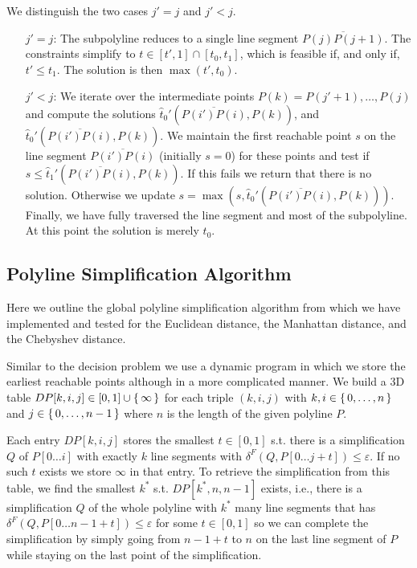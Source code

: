 We distinguish the two cases \(j' = j\) and \(j' < j\). 
\begin{enumerate}
	\item[\(j' = j\): ] The subpolyline reduces to a single line segment \(\overline{P(j)P(j+1)}\). The constraints simplify to \(t \in [t', 1] \cap [t_0, t_1]\), which is feasible if, and only if, \(t' \leq t_1\). The solution is then \(\max(t', t_0)\).

	\item[\(j' < j\): ] We iterate over the intermediate points \(P(k) = P(j'+1), \dots, P(j)\) and compute the solutions \(\hat t_0'(\overline{P(i')P(i)}, P(k))\), and \(\hat t_0'(\overline{P(i')P(i)}, P(k))\). We maintain the first reachable point \(s\) on the line segment \(\overline{P(i')P(i)}\) (initially \(s = 0\)) for these points and test if \(s \leq \hat t_1'(\overline{P(i')P(i)}, P(k))\). If this fails we return that there is no solution. Otherwise we update \(s = \max(s, \hat t_0'(\overline{P(i')P(i)}, P(k)))\). Finally, we have fully traversed the line segment and most of the subpolyline. At this point the solution is merely \(t_0\).
\end{enumerate}

\subsection{Polyline Simplification Algorithm}
\label{ssec:simple_algo_main}

Here we outline the global polyline simplification algorithm from \citeauthor{on_optimal_polyline_simplification_using_the_hausdorff_and_frechet_distance} which we have implemented and tested for the Euclidean distance, the Manhattan distance, and the Chebyshev distance. 

Similar to the decision problem we use a dynamic program in which we store the earliest reachable points although in a more complicated manner. We build a 3D table \(DP[k,i,j] \in [0, 1] \cup \set{\infty}\) for each triple \((k, i, j)\) with \(k, i \in \set{0, \dots, n}\) and \(j \in \set{0, \dots, n - 1}\) where \(n\) is the length of the given polyline \(P\). 

Each entry \(DP[k, i, j]\) stores the smallest \(t \in [0, 1]\) s.t. there is a simplification \(Q\) of \(P[0 \dots i]\) with exactly \(k\) line segments with \(\delta^F(Q, P[0\dots j + t]) \leq \varepsilon\). If no such \(t\) exists we store \(\infty\) in that entry. 
To retrieve the simplification from this table, we find the smallest \(k^*\) s.t. \(DP[k^*, n, n - 1]\) exists, i.e., there is a simplification \(Q\) of the whole polyline with \(k^*\) many line segments that has \(\delta^F(Q, P[0\dots n - 1 + t]) \leq \varepsilon\) for some \(t \in [0, 1]\) so we can complete the simplification by simply going from \(n-1+t\) to \(n\) on the last line segment of \(P\) while staying on the last point of the simplification. 

